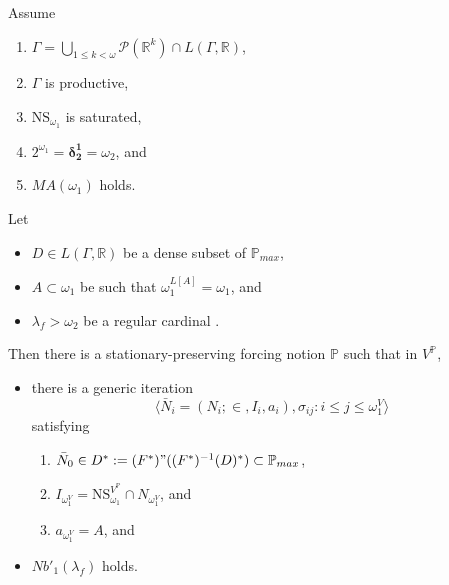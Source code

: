 \documentclass[12pt]{article}
\numberwithin{equation}{section}
\begin{document}
\begin{thm}\label{notion2}
Assume
\begin{enumerate}[label=(\roman*), leftmargin=40pt]
    \item\label{h1} $\Gamma  = \bigcup_{1 \leq k < \omega} \mathcal{P}(\mathbb{R}^{k}) \cap L(\Gamma, \mathbb{R})$,
    \item\label{h2} $\Gamma$ is productive,
    \item\label{h3} $\mathrm{NS}_{\omega_1}$ is saturated,
    \item\label{h4} $2^{\omega_1} = \mathbf{\delta^1_2} = \omega_2$, and
    \item\label{h5} $MA(\omega_1)$ holds.
\end{enumerate}
Let 
\begin{itemize}
    \item $D \in L(\Gamma, \mathbb{R})$ be a dense subset of $\mathbb{P}_{max}$,
    \item $A \subset \omega_1$ be such that $\omega_1^{L[A]} = \omega_1$, and
    \item $\lambda_f > \omega_2$ be a regular cardinal .
\end{itemize}
Then there is a stationary-preserving forcing notion $\mathbb{P}$ such that in $V^{\mathbb{P}}$,
\begin{itemize}
    \item there is a generic iteration $$\langle \bar{N}_i = (N_i; \in, I_i, a_i), \sigma_{ij} : i \leq j \leq \omega_1^V \rangle$$ satisfying 
    \begin{enumerate}[label=(\arabic*), leftmargin=40pt]
        \item\label{nov1} $\bar{N}_0 \in D^* := (F^*) " ((F^*)^{-1}(D)^*) \subset \mathbb{P}_{max}$,
        \item\label{nov2} $I_{\omega_1^V} = \mathrm{NS}_{\omega_1}^{V^{\mathbb{P}}} \cap N_{\omega_1^V}$, and
        \item\label{nov3} $a_{\omega_1^V} = A$, and
    \end{enumerate}
    \item $Nb'_1(\lambda_f)$ holds.
\end{itemize}
\end{thm}
\end{document}
